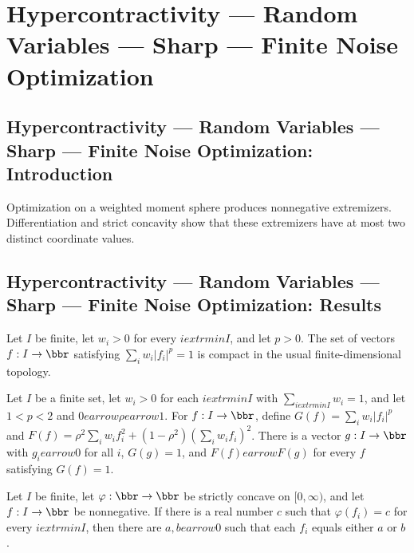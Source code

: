 \section{Hypercontractivity --- Random Variables --- Sharp --- Finite Noise Optimization}
\subsection*{Hypercontractivity --- Random Variables --- Sharp --- Finite Noise Optimization: Introduction}
Optimization on a weighted moment sphere produces nonnegative extremizers. Differentiation and strict concavity show that these extremizers have at most two distinct coordinate values.

\subsection*{Hypercontractivity --- Random Variables --- Sharp --- Finite Noise Optimization: Results}

\begin{theorem}
\leanok
{}
Let $I$ be finite, let $w_i>0$ for every $i	extrm{ in }I$, and let $p>0$. The set of
vectors $f:I\to\bbr$ satisfying $\sum_iw_i|f_i|^p=1$ is compact in the usual
finite-dimensional topology.
\end{theorem}

\begin{theorem}
\leanok
{}
Let $I$ be a finite set, let $w_i>0$ for each $i	extrm{ in }I$ with $\sum_{i	extrm{ in
}I} w_i=1$, and let $1<p<2$ and $0
earrow\rho
earrow1$. For $f:I\to\bbr$, define $G(f)=\sum_i w_i|f_i|^p$ and
$F(f)=\rho^2\sum_iw_if_i^2+(1-\rho^2)(\sum_iw_if_i)^2$. There is a vector $g:I\to\bbr$ with
$g_i
earrow0$ for all $i$, $G(g)=1$, and $F(f)
earrow F(g)$ for every $f$ satisfying $G(f)=1$.
\end{theorem}

\begin{theorem}
\leanok
{}
Let $I$ be finite, let $\varphi:\bbr\to\bbr$ be strictly concave on $[0,\infty)$, and let
$f:I\to\bbr$ be nonnegative. If there is a real number $c$ such that $\varphi(f_i)=c$ for
every $i	extrm{ in }I$, then there are $a,b
earrow0$ such that each $f_i$ equals either $a$ or $b$.
\end{theorem}

